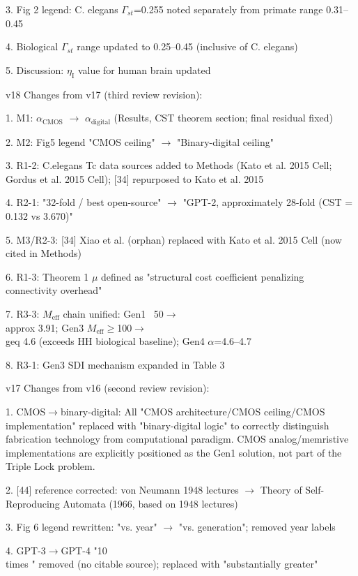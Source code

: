 \documentclass[a4paper,12pt]{article}
\begin{document}
3. Fig 2 legend: C. elegans $\Gamma_{st}$=0.255 noted separately from primate range 0.31--0.45

4. Biological $\Gamma_{st}$ range updated to 0.25--0.45 (inclusive of C. elegans)

5. Discussion: $\eta_{\text{I}}$ value for human brain updated

v18 Changes from v17 (third review revision):

1. M1: $\alpha_{\text{CMOS}}$ $\rightarrow$ $\alpha_{\text{digital}}$ (Results, CST theorem section; final residual fixed)

2. M2: Fig5 legend "CMOS ceiling" $\rightarrow$ "Binary-digital ceiling"

3. R1-2: C.elegans Tc data sources added to Methods (Kato et al. 2015 Cell; Gordus et al. 2015 Cell); [34] repurposed to Kato et al. 2015

4. R2-1: "32-fold / best open-source" $\rightarrow$ "GPT-2, approximately 28-fold (CST = 0.132 vs 3.670)"

5. M3/R2-3: [34] Xiao et al. (orphan) replaced with Kato et al. 2015 Cell (now cited in Methods)

6. R1-3: Theorem 1 $\mu$ defined as "structural cost coefficient penalizing connectivity overhead"

7. R3-3: $M_{\text{eff}}$ chain unified: Gen1 ~50$\rightarrow$\alpha \\approx 3.91; Gen3 $M_{\text{eff}}\geq$100$\rightarrow$\alpha \\geq 4.6 (exceeds HH biological baseline); Gen4 $\alpha$=4.6--4.7

8. R3-1: Gen3 SDI mechanism expanded in Table 3

v17 Changes from v16 (second review revision):

1. CMOS$\rightarrow$binary-digital: All "CMOS architecture/CMOS ceiling/CMOS implementation" replaced with "binary-digital logic" to correctly distinguish fabrication technology from computational paradigm. CMOS analog/memristive implementations are explicitly positioned as the Gen1 solution, not part of the Triple Lock problem.

2. [44] reference corrected: von Neumann 1948 lectures $\rightarrow$ Theory of Self-Reproducing Automata (1966, based on 1948 lectures)

3. Fig 6 legend rewritten: "vs. year" $\rightarrow$ "vs. generation"; removed year labels

4. GPT-3$\rightarrow$GPT-4 "10 \\times " removed (no citable source); replaced with "substantially greater"
\end{document}
